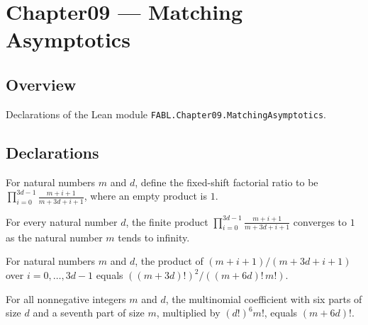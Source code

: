 \chapter{Chapter09 — Matching Asymptotics}
\section{Overview}

Declarations of the Lean module \texttt{FABL.Chapter09.MatchingAsymptotics}.

\section{Declarations}

\begin{definition}
\label{FABL.fixedShiftFactorialRatio}
\leanok
For natural numbers $m$ and $d$, define the fixed-shift factorial ratio to be
$\displaystyle\prod_{i=0}^{3d-1}\frac{m+i+1}{m+3d+i+1}$, where an empty product is $1$.
\end{definition}

\begin{theorem}
\label{FABL.tendsto_fixedShiftFactorialRatio}
\leanok
{}
For every natural number $d$, the finite product
$\displaystyle\prod_{i=0}^{3d-1}\frac{m+i+1}{m+3d+i+1}$ converges to $1$ as the natural
number $m$ tends to infinity.
\end{theorem}

\begin{theorem}
\label{FABL.fixedShiftFactorialRatio_eq_factorial_ratio}
\leanok
{}
For natural numbers $m$ and $d$, the product of $(m+i+1)/(m+3d+i+1)$ over
$i=0,\ldots,3d-1$ equals $((m+3d)!)^2/((m+6d)!\,m!)$.
\end{theorem}

\begin{theorem}
\label{FABL.sixBlockMultinomial_shift_mul_factorials}
\leanok
{}
For all nonnegative integers $m$ and $d$, the multinomial coefficient with six parts of
size $d$ and a seventh part of size $m$, multiplied by $(d!)^6m!$, equals $(m+6d)!$.
\end{theorem}

